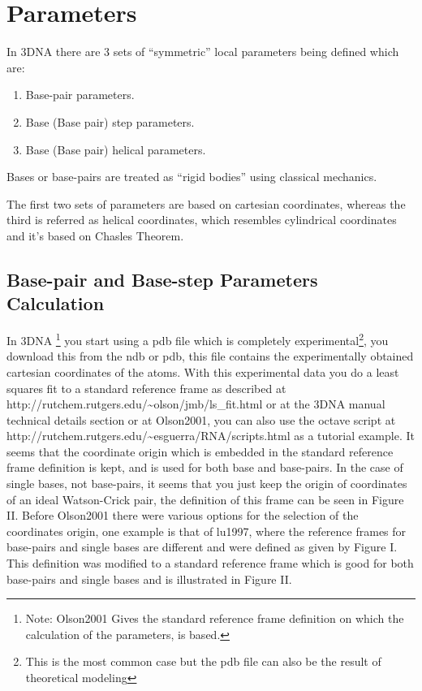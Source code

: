 
\section{Parameters}

In 3DNA there are 3 sets of ``symmetric'' local parameters being defined
which are:

\begin{enumerate}
\item Base-pair parameters.
\item Base (Base pair) step parameters.
\item Base (Base pair) helical parameters.
\end{enumerate}

Bases or base-pairs are treated as ``rigid bodies'' using classical mechanics.

The first two sets of parameters are based on cartesian coordinates,
whereas the third is referred as helical coordinates, which resembles 
cylindrical coordinates and it's based on Chasles Theorem\cite{babcock1994}.

\subsection{Base-pair and Base-step Parameters Calculation}
In 3DNA  \footnote{Note: Olson2001\cite{olson2001} Gives  the standard
reference   frame  definition   on  which   the  calculation   of  the
parameters\cite{lu2003}, \cite{lu1997}  is based.}  you  start using a
pdb file  which is  completely experimental\footnote{This is  the most
common case  but the pdb  file can also  be the result  of theoretical
modeling}, you download  this from the ndb or  pdb, this file contains
the experimentally obtained cartesian  coordinates of the atoms.  With
this  experimental data  you  do a  least  squares fit  to a  standard
reference           frame           as          described           at
http://rutchem.rutgers.edu/\~{}olson/jmb/ls\_fit.html  or at  the 3DNA
manual technical details  section or at Olson2001\cite{olson2001}, you
can       also       use        the       octave       script       at
http://rutchem.rutgers.edu/\~{}esguerra/RNA/scripts.html as a tutorial
example. 
It seems that the  coordinate origin which is embedded in the
standard reference frame definition is kept, and is used for both base
and base-pairs.  In the case of  single bases, not  base-pairs, it seems
that you just keep the  origin of coordinates of an ideal Watson-Crick
pair, the definition  of this frame can be seen  in Figure II.  Before
Olson2001\cite{olson2001} there were various options for the selection
of the coordinates origin, one example is that of lu1997\cite{lu1997},
where  the  reference  frames  for  base-pairs and  single  bases  are
different and were defined as  given by Figure I.  This definition was
modified  to  a  standard  reference  frame which  is  good  for  both
base-pairs and single bases and is illustrated in Figure II.

